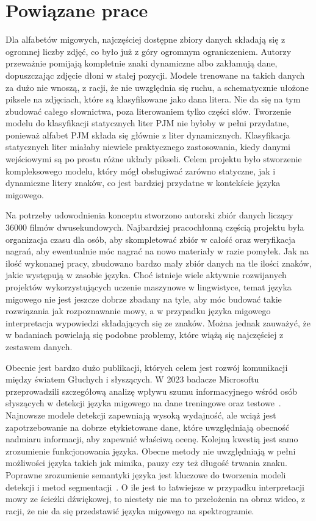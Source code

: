 \section{Powiązane prace}
\label{sec:related-works}

Dla alfabetów migowych, najczęściej dostępne zbiory danych składają się z ogromnej liczby zdjęć, co było już z góry ogromnym ograniczeniem. Autorzy przeważnie pomijają kompletnie znaki dynamiczne albo zakłamują dane, dopuszczając zdjęcie dłoni w stałej pozycji. Modele trenowane na takich danych za dużo nie wnoszą, z racji, że nie uwzględnia się ruchu, a schematycznie ułożone piksele na zdjęciach, które są klasyfikowane jako dana litera. Nie da się na tym zbudować całego słownictwa, poza literowaniem tylko części słów. Tworzenie modelu do klasyfikacji statycznych liter PJM nie byłoby w pełni przydatne, ponieważ alfabet PJM składa się głównie z liter dynamicznych. Klasyfikacja statycznych liter miałaby niewiele praktycznego zastosowania, kiedy danymi wejściowymi są po prostu różne układy pikseli. Celem projektu było stworzenie kompleksowego modelu, który mógł obsługiwać zarówno statyczne, jak i dynamiczne litery znaków, co jest bardziej przydatne w kontekście języka migowego.

Na potrzeby udowodnienia konceptu stworzono autorski zbiór danych liczący 36000 filmów dwusekundowych. Najbardziej pracochłonną częścią projektu była organizacja czasu dla osób, aby skompletować zbiór w całość oraz weryfikacja nagrań, aby ewentualnie móc nagrać na nowo materiały w razie pomyłek. Jak na ilość wykonanej pracy, zbudowano bardzo mały zbiór danych na tle ilości znaków, jakie występują w zasobie języka. Choć istnieje wiele aktywnie rozwijanych projektów wykorzystujących uczenie maszynowe w lingwistyce, temat języka migowego nie jest jeszcze dobrze zbadany na tyle, aby móc budować takie rozwiązania jak rozpoznawanie mowy, a w przypadku języka migowego interpretacja wypowiedzi składających się ze znaków. Można jednak zauważyć, że w badaniach powielają się podobne problemy, które wiążą się najczęściej z zestawem danych.

Obecnie jest bardzo dużo publikacji, których celem jest rozwój komunikacji między światem Głuchych i słyszących. W 2023 badacze Microsoftu przeprowadzili szczegółową analizę wpływu szumu informacyjnego wśród osób słyszących w detekcji języka migowego na dane treningowe oraz testowe~\cite{pal2023}. Najnowsze modele detekcji zapewniają wysoką wydajność, ale wciąż jest zapotrzebowanie na dobrze etykietowane dane, które uwzględniają obecność nadmiaru informacji, aby zapewnić właściwą ocenę. Kolejną kwestią jest samo zrozumienie funkcjonowania języka. Obecne metody nie uwzględniają w pełni możliwości języka takich jak mimika, pauzy czy też długość trwania znaku. Poprawne zrozumienie semantyki języka jest kluczowe do tworzenia modeli detekcji i metod segmentacji~\cite{deSisto2021}. O ile jest to łatwiejsze w przypadku interpretacji mowy ze ścieżki dźwiękowej, to niestety nie ma to przełożenia na obraz wideo, z racji, że nie da się przedstawić języka migowego na spektrogramie.
